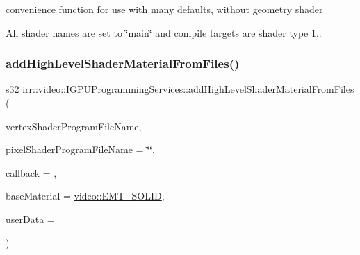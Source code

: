 convenience function for use with many defaults, without geometry shader 

All shader names are set to \char`\"{}main\char`\"{} and compile targets are shader type 1.. \mbox{\label{classirr_1_1video_1_1IGPUProgrammingServices_a6ad72d2498a05669231531d54d849655}} 
\subsubsection{\texorpdfstring{add\+High\+Level\+Shader\+Material\+From\+Files()}{addHighLevelShaderMaterialFromFiles()}\hspace{0.1cm}{\footnotesize\ttfamily [4/8]}}
{\footnotesize\ttfamily \hyperlink{namespaceirr_ac66849b7a6ed16e30ebede579f9b47c6}{s32} irr\+::video\+::\+I\+G\+P\+U\+Programming\+Services\+::add\+High\+Level\+Shader\+Material\+From\+Files (\begin{DoxyParamCaption}\item[{const \hyperlink{namespaceirr_1_1io_a6468281622ce3a1c46b72e19f32dded5}{io\+::path} \&}]{vertex\+Shader\+Program\+File\+Name,  }\item[{const \hyperlink{namespaceirr_1_1io_a6468281622ce3a1c46b72e19f32dded5}{io\+::path} \&}]{pixel\+Shader\+Program\+File\+Name = {\ttfamily \char`\"{}\char`\"{}},  }\item[{\hyperlink{classirr_1_1video_1_1IShaderConstantSetCallBack}{I\+Shader\+Constant\+Set\+Call\+Back} $\ast$}]{callback = {},  }\item[{\hyperlink{namespaceirr_1_1video_ac8e9b6c66f7cebabd1a6d30cbc5430f1}{E\+\_\+\+M\+A\+T\+E\+R\+I\+A\+L\+\_\+\+T\+Y\+PE}}]{base\+Material = {\ttfamily \hyperlink{namespaceirr_1_1video_ac8e9b6c66f7cebabd1a6d30cbc5430f1aa0b13db05ac3b5f40e692769de202660}{video\+::\+E\+M\+T\+\_\+\+S\+O\+L\+ID}},  }\item[{\hyperlink{namespaceirr_ac66849b7a6ed16e30ebede579f9b47c6}{s32}}]{user\+Data = {} }\end{DoxyParamCaption})\hspace{0.3cm}{\ttfamily [inline]}}



